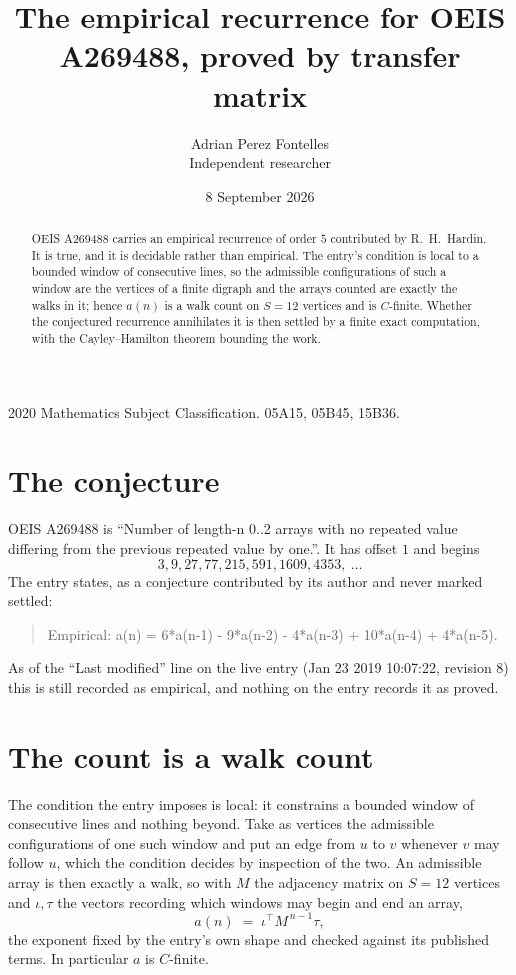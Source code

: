 \documentclass[11pt,a4paper]{article}
\title{The empirical recurrence for OEIS A269488, proved by transfer matrix}
\author{Adrian Perez Fontelles\\ \small Independent researcher}
\date{8 September 2026}
\theoremstyle{plain}
\theoremstyle{definition}
\begin{document}
\maketitle

\begin{abstract}
OEIS A269488 carries an empirical recurrence of order $5$ contributed by R.~H.~Hardin. It is
true, and it is decidable rather than empirical. The entry's condition is local to a bounded window of consecutive lines, so
the admissible configurations of such a window are the vertices of a finite digraph and the
arrays counted are exactly the walks in it; hence $a(n)$ is a walk count on $S=12$ vertices
and is $C$-finite. Whether the conjectured recurrence annihilates it is then settled by a
finite exact computation, with the Cayley--Hamilton theorem bounding the work.
\end{abstract}

\noindent\small 2020 Mathematics Subject Classification. 05A15, 05B45, 15B36.\normalsize

\section{The conjecture}

OEIS A269488 is ``Number of length-n 0..2 arrays with no repeated value differing from the previous repeated value by one.''. It has offset $1$ and begins
\[
3, 9, 27, 77, 215, 591, 1609, 4353,\ \dots
\]
The entry states, as a conjecture contributed by its author and never marked settled:
\begin{quote}
Empirical: a(n) = 6*a(n-1) - 9*a(n-2) - 4*a(n-3) + 10*a(n-4) + 4*a(n-5).
\end{quote}
As of the ``Last modified'' line on the live entry (Jan 23 2019 10:07:22, revision 8) this is still
recorded as empirical, and nothing on the entry records it as proved.

\section{The count is a walk count}

The condition the entry imposes is local: it constrains a bounded window of consecutive lines and nothing beyond. Take as
vertices the admissible configurations of one such window and put an edge from $u$ to $v$
whenever $v$ may follow $u$, which the condition decides by inspection of the two. An
admissible array is then exactly a walk, so with $M$ the adjacency matrix on $S=12$ vertices
and $\iota,\tau$ the vectors recording which windows may begin and end an array,
\[
a(n)\;=\;\iota^{\!\top}M^{\,n-1}\tau ,
\]
the exponent fixed by the entry's own shape and checked against its published terms. In
particular $a$ is $C$-finite.
\end{document}

